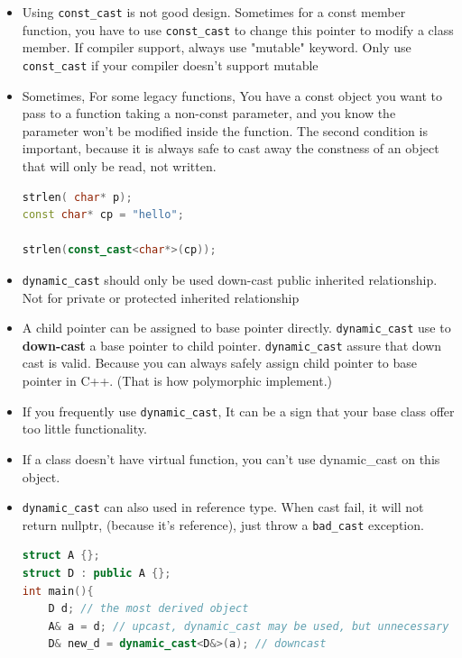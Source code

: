 \documentclass[a4paper,12pt,twoside]{book}
\begin{document}
\begin{itemize}
\item Using \texttt{const\_cast} is not good design. Sometimes for a const member function, you have to use \texttt{const\_cast} to change this pointer to modify a class member. If compiler support, always use "mutable"  keyword.  Only use \texttt{const\_cast} if your compiler doesn't support mutable

\item Sometimes, For some legacy functions, You have a const object you want to pass to a function taking a non-const parameter, and you know the parameter won't be modified inside the function. The second condition is important, because it is always safe to cast away the constness of an object that will only be read, not written.

\begin{lstlisting}[frame=single, language=c++, mathescape=true]
strlen( char* p);
const char* cp = "hello";

strlen(const_cast<char*>(cp));
\end{lstlisting}

\item \texttt{dynamic\_cast} should only be used down-cast public inherited relationship. Not for private or protected inherited relationship

\item A child pointer can be assigned to base pointer directly. \texttt{dynamic\_cast} use to \textbf{down-cast} a base pointer to child pointer. \texttt{dynamic\_cast} assure that down cast is valid. Because you can always safely assign child pointer to base pointer in C++. (That is how polymorphic implement.)

\item If you frequently use \texttt{dynamic\_cast}, It can be a sign that your base class offer too little functionality.

\item If a class doesn't have virtual function, you can't use dynamic\_cast on this object.
\item \texttt{dynamic\_cast} can also used in reference type. When cast fail, it will not return nullptr, (because it's reference), just throw a \texttt{bad\_cast} exception.
\begin{lstlisting}[frame=single, language=c++, mathescape=true]
struct A {};
struct D : public A {};
int main(){
    D d; // the most derived object
    A& a = d; // upcast, dynamic_cast may be used, but unnecessary
    D& new_d = dynamic_cast<D&>(a); // downcast
\end{lstlisting}



\end{itemize}
\end{document}
